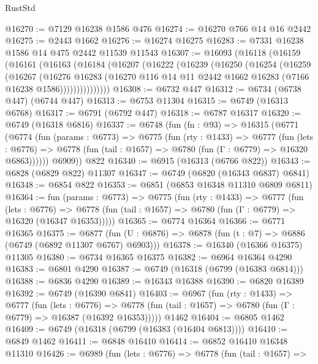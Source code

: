 \begin{lexlean}{RustStd}
\begin{coremodule}
@16270 := @7129 @16238 @1586 @476
@16274 := @16270 @766 @14 @16 @2442
@16275 := @2443 @1662
@16276 := @16274 @16275
@16283 := @7331 @16238 @1586 @14 @475 @2442 @11539 @11543
@16307 := @16093
    (@16118
      (@16159
        (@16161
          (@16163
            (@16184
              (@16207
                (@16222
                  (@16239
                    (@16250
                      (@16254
                        (@16259
                          (@16267
                            (@16276
                              @16283
                              (@16270
                                @116
                                @14
                                @11
                                @2442
                                @1662
                                @16283
                                (@7166 @16238 @1586)))))))))))))))
@16308 := @6732 @447
@16312 := @6734 (@6738 @447) (@6744 @447)
@16313 := @6753 @11304
@16315 := @6749 (@16313 @6768)
@16317 := @6791 (@6792 @447)
@16318 := @6787 @16317
@16320 := @6749 (@16318 @6816)
@16337 := @6748
    (fun (fn : @93) =>
    @16315
      (@6771
        (@6774
          (fun (params : @6773) =>
          @6775
            (fun (rty : @1433) =>
            @6777
              (fun (lets : @6776) =>
              @6778 (fun (tail : @1657) => @6780 (fun (Γ : @6779) => @16320 @6863))))))
        @6909))
    @822
@16340 := @6915 (@16313 (@6766 @822))
@16343 := @6828 (@6829 @822) @11307
@16347 := @6749 (@6820 (@16343 @6837) @6841)
@16348 := @6854 @822
@16353 := @6851 (@6853 @16348 @11310 @6809 @6811)
@16364 := fun (params : @6773) =>
  @6775
    (fun (rty : @1433) =>
    @6777
      (fun (lets : @6776) =>
      @6778 (fun (tail : @1657) => @6780 (fun (Γ : @6779) => @16320 (@16347 @16353)))))
@16365 := @6774 @16364
@16366 := @6771 @16365
@16375 := @6877
    (fun (U : @6876) => @6878 (fun (t : @7) => @6886 (@6749 (@6892 @11307 @6767) @6903)))
@16378 := @16340 (@16366 @16375) @11305
@16380 := @6734 @16365 @16375
@16382 := @6964 @16364 @4290
@16383 := @6801 @4290
@16387 := @6749 (@16318 (@6799 (@16383 @6814)))
@16388 := @6836 @4290
@16389 := @16343 @16388
@16390 := @6820 @16389
@16392 := @6749 (@16390 @6841)
@16403 := @6967
    (fun (rty : @1433) =>
    @6777
      (fun (lets : @6776) =>
      @6778 (fun (tail : @1657) => @6780 (fun (Γ : @6779) => @16387 (@16392 @16353)))))
    @1462
@16404 := @6805 @1462
@16409 := @6749 (@16318 (@6799 (@16383 (@16404 @6813))))
@16410 := @6849 @1462
@16411 := @6848 @16410
@16414 := @6852 @16410 @16348 @11310
@16426 := @6989
    (fun (lets : @6776) =>
    @6778
      (fun (tail : @1657) =>

\end{coremodule}
\end{lexlean}
